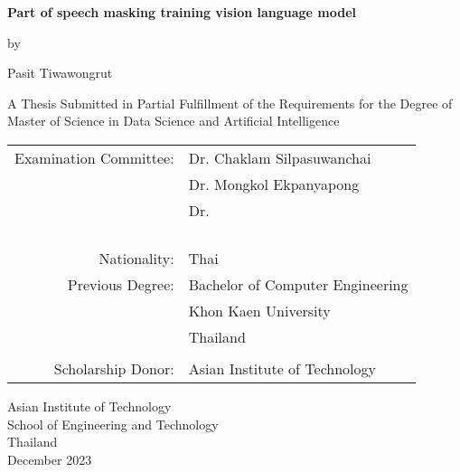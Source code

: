 \begin{titlepage}
  \begin{center}
   
  \textbf{\large{ Part of speech masking training vision language model }}

  \vspace{3em} %
  
  by
  
  \vspace{3em} %
  
  Pasit Tiwawongrut
  
  \vspace{4em} %

  A Thesis Submitted in Partial Fulfillment of the Requirements for the Degree of Master of Science in Data Science and Artificial Intelligence

  \vspace{4em} %

\begin{center}
  \begin{tabular}{ rl }
Examination Committee: & Dr. Chaklam Silpasuwanchai \\
                       & Dr. Mongkol Ekpanyapong \\
                       & Dr.  \\\\
                       
\\ \\ \\
Nationality:     & Thai \\
Previous Degree: & Bachelor of Computer Engineering \\
                 & Khon Kaen University \\
                 & Thailand \\
\\
Scholarship Donor: & Asian Institute of Technology
  \end{tabular}
\end{center}

\vspace{3em}

Asian Institute of Technology \\
School of Engineering and Technology \\
Thailand \\           
December 2023


  \end{center}
\end{titlepage}
